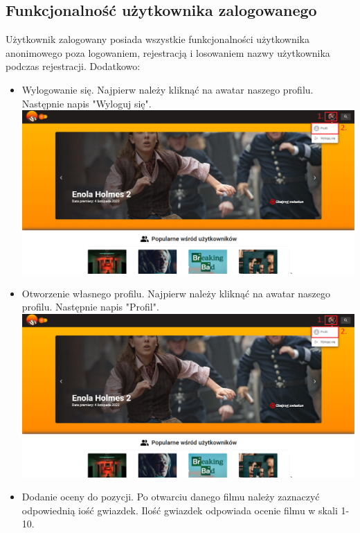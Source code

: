 \documentclass[12pt]{article}
\begin{document}
\begin{flushleft}
		\subsection{Funkcjonalność użytkownika zalogowanego}
		Użytkownik zalogowany posiada wszystkie funkcjonalności użytkownika anonimowego poza logowaniem, rejestracją i losowaniem nazwy użytkownika podczas rejestracji. Dodatkowo:
		\begin{itemize}
			\item Wylogowanie się.\linebreak
			Najpierw należy kliknąć na awatar naszego profilu. Następnie napis "Wyloguj się".\linebreak
			\includegraphics[scale=0.3]{Wylogowanie.png}
			\item Otworzenie własnego profilu.\linebreak
			Najpierw należy kliknąć na awatar naszego profilu. Następnie napis "Profil".\linebreak
			\includegraphics[scale=0.3]{OtwarcieProfilu.png}
			\item Dodanie oceny do pozycji.\linebreak
			Po otwarciu danego filmu należy zaznaczyć odpowiednią iość gwiazdek. Ilość gwiazdek odpowiada ocenie filmu w skali 1-10. \linebreak

\end{itemize}
\end{flushleft}
\end{document}
